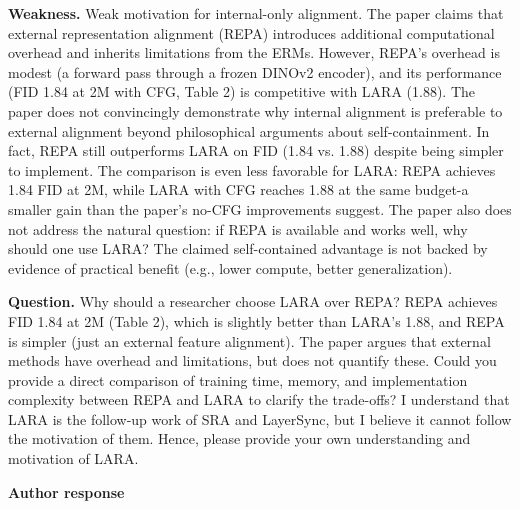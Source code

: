 \documentclass[10pt,letterpaper]{article}
\newcommand{\SectionLabel}[1]{%
  {\small\bfseries\color{blue}#1\par}\vspace{0.08em}
}
\begin{document}
\begin{reviewbox}

\textbf{Weakness.} Weak motivation for \textquotedbl{}internal-only\textquotedbl{} alignment. The paper claims that external representation alignment (REPA) introduces \textquotedbl{}additional computational overhead\textquotedbl{} and \textquotedbl{}inherits limitations from the ERMs.\textquotedbl{} However, REPA's overhead is modest (a forward pass through a frozen DINOv2 encoder), and its performance (FID 1.84 at 2M with CFG, Table 2) is competitive with LARA (1.88). The paper does not convincingly demonstrate why internal alignment is preferable to external alignment beyond philosophical arguments about self-containment. In fact, REPA still outperforms LARA on FID (1.84 vs. 1.88) despite being simpler to implement. The comparison is even less favorable for LARA: REPA achieves 1.84 FID at 2M, while LARA with CFG reaches 1.88 at the same budget-a smaller gain than the paper's no-CFG improvements suggest. The paper also does not address the natural question: if REPA is available and works well, why should one use LARA? The claimed \textquotedbl{}self-contained\textquotedbl{} advantage is not backed by evidence of practical benefit (e.g., lower compute, better generalization).\par

\textbf{Question.} Why should a researcher choose LARA over REPA? REPA achieves FID 1.84 at 2M (Table 2), which is slightly better than LARA's 1.88, and REPA is simpler (just an external feature alignment). The paper argues that external methods have \textquotedbl{}overhead\textquotedbl{} and \textquotedbl{}limitations,\textquotedbl{} but does not quantify these. Could you provide a direct comparison of training time, memory, and implementation complexity between REPA and LARA to clarify the trade-offs? I understand that LARA is the follow-up work of SRA and LayerSync, but I believe it cannot follow the motivation of them. Hence, please provide your own understanding and motivation of LARA.\par

\end{reviewbox}

\SectionLabel{Author response}
\end{document}
